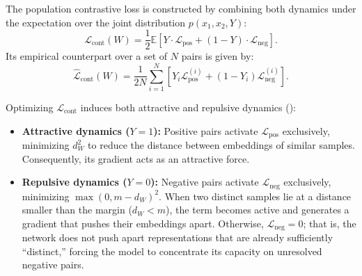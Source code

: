 \documentclass[11pt, oneside, openany]{book}
\begin{document}
\begin{definition}
\label{def:4.2}
The population contrastive loss is constructed by combining both dynamics under the expectation over the joint distribution $p(x_{1}, x_{2}, Y)$:
\begin{equation}
\label{eq:4.4}
\mathcal{L}_{\text{cont}}(W) = \frac{1}{2} \mathbb{E}\left[ Y \cdot \mathcal{L}_{\text{pos}} + (1 - Y) \cdot \mathcal{L}_{\text{neg}} \right].
\end{equation}
Its empirical counterpart over a set of $N$ pairs is given by:
\begin{equation}
\label{eq:4.5}
\hat{\mathcal{L}}_{\text{cont}}(W) = \frac{1}{2N} \sum_{i=1}^{N} \left[ Y_{i} \mathcal{L}_{\text{pos}}^{(i)} + (1 - Y_{i}) \mathcal{L}_{\text{neg}}^{(i)} \right].
\end{equation}
\end{definition}

Optimizing $\mathcal{L}_{\text{cont}}$ induces both attractive and repulsive dynamics ():
\begin{itemize}
    \item \textbf{Attractive dynamics ($Y = 1$):} Positive pairs activate $\mathcal{L}_{\text{pos}}$ exclusively, minimizing $d_{W}^{2}$ to reduce the distance between embeddings of similar samples. Consequently, its gradient acts as an attractive force.
    \item \textbf{Repulsive dynamics ($Y = 0$):} Negative pairs activate $\mathcal{L}_{\text{neg}}$ exclusively, minimizing $\max(0, m - d_{W})^{2}$. When two distinct samples lie at a distance smaller than the margin ($d_{W} < m$), the term becomes active and generates a gradient that pushes their embeddings apart. Otherwise, $\mathcal{L}_{\text{neg}} = 0$; that is, the network does not push apart representations that are already sufficiently ``distinct,'' forcing the model to concentrate its capacity on unresolved negative pairs.
\end{itemize}
\end{document}
